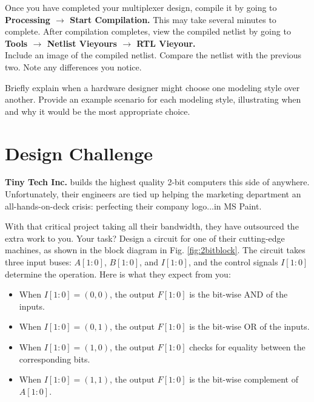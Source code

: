 \documentclass[12pt]{labmanual}
\begin{document}
\clearpage

\begin{question}
    Once you have completed your multiplexer design, compile it by going to \textbf{Processing $\longrightarrow$ Start Compilation.} This may take several minutes to complete. After compilation completes, view the compiled netlist by going to \textbf{Tools $\longrightarrow$ Netlist Vieyours $\longrightarrow$ RTL Vieyour.} \\
    Include an image of the compiled netlist. Compare the netlist with the previous two. Note any differences you notice.
\end{question}

\begin{question}
    Briefly explain when a hardware designer might choose one modeling style over another. Provide an example scenario for each modeling style, illustrating when and why it would be the most appropriate choice.
\end{question}

\clearpage
\section{Design Challenge}


\textbf{Tiny Tech Inc.} builds the highest quality 2-bit computers this side of anywhere. Unfortunately, their engineers are tied up helping the marketing department an all-hands-on-deck crisis: perfecting their company logo...in MS Paint.

With that critical project taking all their bandwidth, they have outsourced the extra work to you. Your task? Design a circuit for one of their cutting-edge machines, as shown in the block diagram in Fig. \ref{fig:2bitblock}. The circuit takes three input buses: \(A[1:0]\), \(B[1:0]\), and \(I[1:0]\), and the control signals \(I[1:0]\) determine the operation. Here is what they expect from you:

\begin{itemize}
  \item When \(I[1:0] = (0,0)\), the output \(F[1:0]\) is the bit-wise AND of the inputs.
  \item When \(I[1:0] = (0,1)\), the output \(F[1:0]\) is the bit-wise OR of the inputs.
  \item When \(I[1:0] = (1,0)\), the output \(F[1:0]\) checks for equality between the corresponding bits.
  \item When \(I[1:0] = (1,1)\), the output \(F[1:0]\) is the bit-wise complement of \(A[1:0]\).
\end{itemize}
\end{document}
